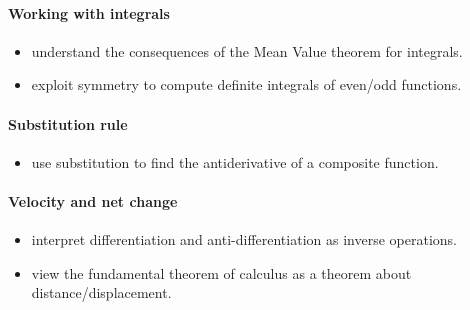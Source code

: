 \documentclass{amsart}
\begin{document}
\paragraph*{Working with integrals}
\begin{itemize}
\item understand the consequences of the Mean Value theorem for
  integrals.
\item exploit symmetry to compute definite integrals of even/odd functions. 
\end{itemize}


\paragraph*{Substitution rule}
\begin{itemize}
\item use substitution to find the antiderivative of a composite function.
\end{itemize}


\paragraph*{Velocity and net change}
\begin{itemize}
\item interpret differentiation and anti-differentiation as inverse operations.
\item view the fundamental theorem of calculus as a theorem about
  distance/displacement.
\end{itemize}
\end{document}

